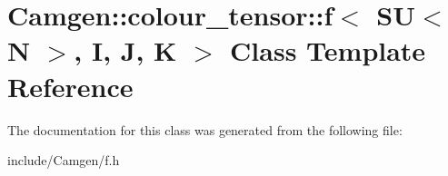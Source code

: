 \hypertarget{a00218}{}\section{Camgen\+:\+:colour\+\_\+tensor\+:\+:f$<$ S\+U$<$ N $>$, I, J, K $>$ Class Template Reference}
\label{a00218}


The documentation for this class was generated from the following file\+:\begin{DoxyCompactItemize}
\item 
include/\+Camgen/f.\+h\end{DoxyCompactItemize}
